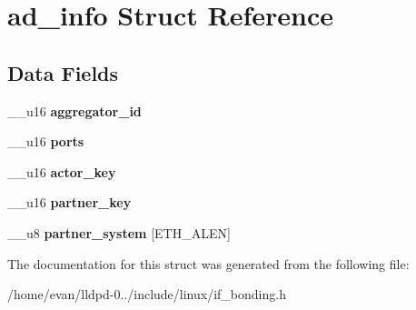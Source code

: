 \section{ad\-\_\-info \-Struct \-Reference}
\label{structad__info}
\subsection*{\-Data \-Fields}
\begin{DoxyCompactItemize}
\item 
\-\_\-\-\_\-u16 {\bfseries aggregator\-\_\-id}\label{structad__info_a81098c671256ace837465130048e4649}

\item 
\-\_\-\-\_\-u16 {\bfseries ports}\label{structad__info_abdb9d0ba982f97445bbd41d40279e820}

\item 
\-\_\-\-\_\-u16 {\bfseries actor\-\_\-key}\label{structad__info_ac864d094f2235330e061fd507f2a2899}

\item 
\-\_\-\-\_\-u16 {\bfseries partner\-\_\-key}\label{structad__info_a8fda59f511bbd5a20dda48fdeacffc6a}

\item 
\-\_\-\-\_\-u8 {\bfseries partner\-\_\-system} [\-E\-T\-H\-\_\-\-A\-L\-E\-N]\label{structad__info_a98a040e8f3efa01c35d213ef0d2a676c}

\end{DoxyCompactItemize}


\-The documentation for this struct was generated from the following file\-:\begin{DoxyCompactItemize}
\item 
/home/evan/lldpd-\/0../include/linux/if\-\_\-bonding.\-h\end{DoxyCompactItemize}
